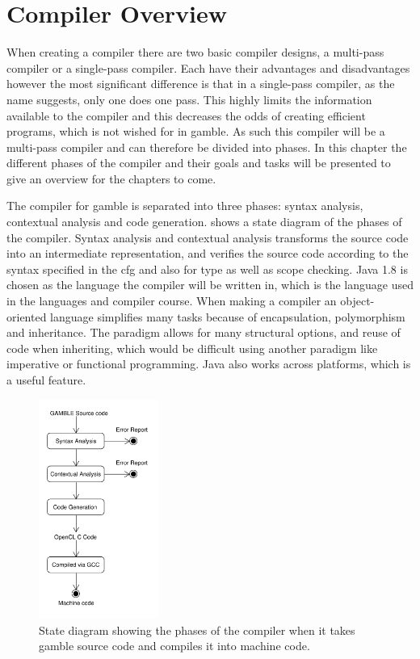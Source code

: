 \chapter{Compiler Overview}\label{Chp:CompilerOverview}
When creating a compiler there are two basic compiler designs, a multi-pass compiler or a single-pass compiler.
Each have their advantages and disadvantages however the most significant difference is that in a single-pass compiler, as the name suggests, only one does one pass.
This highly limits the information available to the compiler and this decreases the odds of creating efficient programs, which is not wished for in \gls{gamble}.
As such this compiler will be a multi-pass compiler and can therefore be divided into phases.
In this chapter the different phases of the compiler and their goals and tasks will be presented to give an overview for the chapters to come.

The compiler for \gls{gamble} is separated into three phases: syntax analysis, contextual analysis and code generation.
 shows a state diagram of the phases of the compiler.
Syntax analysis and contextual analysis transforms the source code into an intermediate representation, and verifies the source code according to the  syntax specified in the \acrshort{cfg} and also for type as well as scope checking.
Java 1.8 is chosen as the language the compiler will be written in, which is the language used in the languages and compiler course.
When making a compiler an object-oriented language simplifies many tasks because of encapsulation, polymorphism and inheritance. 
The paradigm allows for many structural options, and reuse of code when inheriting, which would be difficult using another paradigm like imperative or functional programming.
Java also works across platforms, which is a useful feature.

\begin{figure}[ht]
\centering
\includegraphics[width=0.35\textwidth]{figures/ClassDiagrams/CompilerDiagram.pdf}
\caption{State diagram showing the phases of the compiler when it takes \gls{gamble} source code and compiles it into machine code.}\label{fig:phases}
\end{figure}

